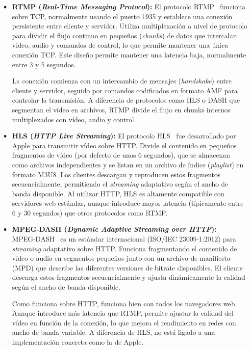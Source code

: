 \begin{itemize}
    \item \textbf{RTMP (\emph{Real-Time Messaging Protocol}):} El protocolo RTMP~\citep{rtmp_adobe} funciona sobre TCP, normalmente usando el puerto 1935 y establece una conexión persistente entre cliente y servidor.
    Utiliza multiplexación a nivel de protocolo para dividir el flujo continuo en pequeños (\emph{chunks}) de datos que intercalan vídeo, audio y comandos de control,
    lo que permite mantener una única conexión TCP.
    Este diseño permite mantener una latencia baja, normalmente entre 3 y 5 segundos.

    La conexión comienza con un intercambio de mensajes (\emph{handshake}) entre cliente y servidor, seguido por comandos codificados en formato AMF para controlar la transmisión.
    A diferencia de protocolos como HLS o DASH que segmentan el vídeo en archivos, RTMP divide el flujo en chunks internos multiplexados con vídeo, audio y control.

    \item \textbf{HLS (\emph{HTTP Live Streaming}):} El protocolo HLS~\citep{hls_ietf} fue desarrollado por Apple para transmitir vídeo sobre HTTP.
    Divide el contenido en pequeños fragmentos de vídeo (por defecto de unos 6 segundos), que se almacenan como archivos independientes y se listan en un archivo de índice (\emph{playlist}) en formato M3U8.
    Los clientes descargan y reproducen estos fragmentos secuencialmente, permitiendo el \emph{streaming} adaptativo según el ancho de banda disponible.
    Al utilizar HTTP, HLS es altamente compatible con servidores web estándar, aunque introduce mayor latencia (típicamente entre 6 y 30 segundos) que otros protocolos como RTMP.

    \item \textbf{MPEG-DASH (\emph{Dynamic Adaptive Streaming over HTTP}):} MPEG‑DASH~\citep{dash_iso} es un estándar internacional (ISO/IEC 23009‑1:2012) para \emph{streaming} adaptativo sobre HTTP.
    Funciona fragmentando el contenido de vídeo o audio en segmentos pequeños junto con un archivo de manifiesto (MPD) que describe las diferentes versiones de bitrate disponibles.
    El cliente descarga estos fragmentos secuencialmente y ajusta dinámicamente la calidad según el ancho de banda disponible.

    Como funciona sobre HTTP, funciona bien con todos los navegadores web.
    Aunque introduce más latencia que RTMP, permite ajustar la calidad del vídeo en función de la conexión, lo que mejora el rendimiento en redes con ancho de banda variable.
    A diferencia de HLS, no está ligado a una implementación concreta como la de Apple.


\end{itemize}
